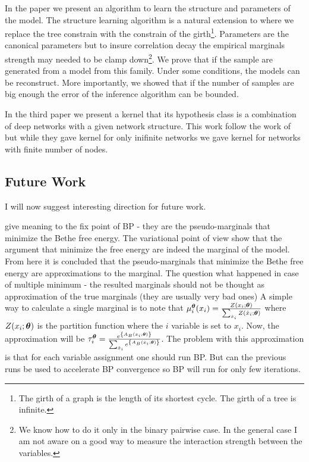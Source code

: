 In the paper we present an algorithm to learn the structure and parameters of the model.
The structure learning algorithm is a natural extension to \cite{chowLiu} where we replace the tree constrain with the constrain of the girth\footnote{The girth of a graph is the length of its shortest cycle. The girth of a tree is infinite.}.
Parameters are the canonical parameters but to insure correlation decay the empirical marginals strength may needed to be clamp down\footnote{We know how to do it only in the binary pairwise case. In the general case I am not aware on a good way to measure the interaction strength between the variables.}.
We prove that if the sample are generated from a model from this family.
Under some conditions, the models can be reconstruct.
More importantly, we showed that if the number of samples are big enough the error of the inference algorithm can be bounded.

In the third paper  we present a kernel that its hypothesis class is a combination of deep networks with a given network structure. This work follow the work of \cite{cho2009kernel} but while they gave kernel for only inifinite networks we gave kernel for networks with finite number of nodes.

\subsection{Future Work}
I will now suggest interesting direction for future work.

 give meaning to the fix point of BP - they are the pseudo-marginals that minimize the Bethe free energy.  
The variational point of view show that the argument that minimize the free energy are indeed the marginal of the model.
From here it is concluded that the pseudo-marginals that minimize the Bethe free energy are approximations to the marginal. 
The question what happened in case of multiple minimum - the resulted marginals should not be thought as approximation of the true marginals (they are usually very bad ones)
A simple way to calculate a single marginal is to note that $\mu_i^{\boldsymbol{\theta}}(x_i) = \frac{Z(x_i;\boldsymbol{\theta})}{\sum_{\hat{x}_i}Z(\hat{x}_i;\boldsymbol{\theta})}$  where $Z(x_i;\boldsymbol{\theta})$%
is the partition function where the $i$ variable is set to $x_i$.
Now, the approximation will be $\tau_i^{\boldsymbol{\theta}} = \frac{e^{\left\{A_B(x_i;\boldsymbol{\theta})\right\}}}{\sum_{\hat{x}_i}e^{\left\{A_B(\hat{x}_i;\boldsymbol{\theta})\right\}}}$.
The problem with this approximation is that for each variable assignment one should run BP.
But can the previous runs be used to accelerate BP convergence so BP will run for only few iterations.
  

